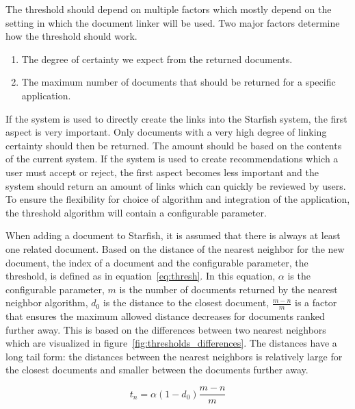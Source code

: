 The threshold should depend on multiple factors which mostly depend on the setting in which the document linker will be used. Two major factors determine how the threshold should work.
\begin{enumerate}[1.]
	\item The degree of certainty we expect from the returned documents.
	\item The maximum number of documents that should be returned for a specific application.
\end{enumerate}
If the system is used to directly create the links into the Starfish system, the first aspect is very important. Only documents with a very high degree of linking certainty should then be returned. The amount should be based on the contents of the current system. If the system is used to create recommendations which a user must accept or reject, the first aspect becomes less important and the system should return an amount of links which can quickly be reviewed by users. To ensure the flexibility for choice of algorithm and integration of the application, the threshold algorithm will contain a configurable parameter.

When adding a document to Starfish, it is assumed that there is always at least one related document. Based on the distance of the nearest neighbor for the new document, the index of a document and the configurable parameter, the threshold, is defined as in equation~\ref{eq:thresh}. In this equation, $\alpha$ is the configurable parameter, $m$ is the number of documents returned by the nearest neighbor algorithm, $d_0$ is the distance to the closest document, $\frac{m - n}{m}$ is a factor that ensures the maximum allowed distance decreases for documents ranked further away. This is based on the differences between two nearest neighbors which are visualized in figure~\ref{fig:thresholds_differences}. The distances have a long tail form: the distances between the nearest neighbors is relatively large for the closest documents and smaller between the documents further away. 

\begin{equation}
t_n = \alpha (1 - d_0) \frac{m - n}{m}
\label{eq:thresh}
\end{equation}
